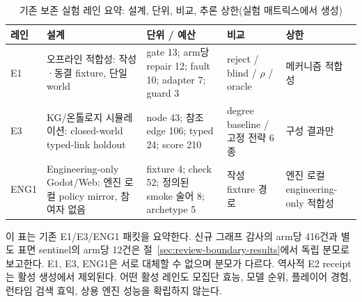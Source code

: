 \begin{table}[t]
\caption{기존 보존 실험 레인 요약: 설계, 단위, 비교, 추론 상한(실험 매트릭스에서 생성)}
\label{tab:evidence-lanes}
\centering\scriptsize
\setlength{\tabcolsep}{4pt}
\renewcommand{\arraystretch}{1.20}
\begin{tabularx}{\columnwidth}{@{}l>{\raggedright\arraybackslash}X>{\raggedright\arraybackslash}p{}>{\raggedright\arraybackslash}p{}>{\raggedright\arraybackslash}p{}@{}}
\toprule
\textbf{레인} & \textbf{설계} & \textbf{단위 / 예산} & \textbf{비교} & \textbf{상한} \\
\midrule
E1 & 오프라인 적합성: 작성·동결 fixture, 단일 world & gate 13; arm당 repair 12; fault 10; adapter 7; guard 3 & reject / blind / $\rho$ / oracle & 메커니즘 적합성 \\
E3 & KG/온톨로지 시뮬레이션: closed-world typed-link holdout & node 43; 참조 edge 106; typed 24; score 210 & degree baseline / 고정 전략 6종 & 구성 결과만 \\
ENG1 & Engineering-only Godot/Web: 엔진 로컬 policy mirror, 참여자 없음 & fixture 4; check 52; 정의된 smoke 술어 8; archetype 5 & 작성 fixture 경로 & 엔진 로컬 engineering-only 적합성 \\
\bottomrule
\end{tabularx}
\par\vspace{3pt}\noindent\parbox{0.96\columnwidth}{\scriptsize 이 표는 기존 E1/E3/ENG1 패킷을 요약한다. 신규 그래프 감사의 arm당 416건과 별도 표면 sentinel의 arm당 12건은 절~\ref{sec:review-boundary-results}에서 독립 분모로 보고한다. E1, E3, ENG1은 서로 대체할 수 없으며 분모가 다르다. 역사적 E2 receipt는 활성 생성에서 제외된다. 어떤 활성 레인도 모집단 효능, 모델 순위, 플레이어 경험, 런타임 검색 효익, 상용 엔진 성능을 확립하지 않는다.}
\end{table}
